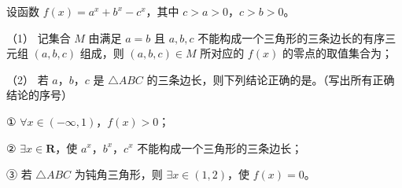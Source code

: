 \begin{question}
设函数 $f(x)=a^x+b^x-c^x$，其中 $c>a>0$，$c>b>0$。

（1） 记集合 $M$ 由满足 $a=b$ 且 $a,b,c$ 不能构成一个三角形的三条边长的有序三元组 $(a,b,c)$ 组成，则 $(a,b,c)\in M$ 所对应的 $f(x)$ 的零点的取值集合为\gkblank{}；

（2） 若 $a$，$b$，$c$ 是 $\triangle ABC$ 的三条边长，则下列结论正确的是\gkblank{}。（写出所有正确结论的序号）

① $\forall x\in(-\infty,1)$，$f(x)>0$；

② $\exists x\in\mathbf R$，使 $a^x$，$b^x$，$c^x$ 不能构成一个三角形的三条边长；

③ 若 $\triangle ABC$ 为钝角三角形，则 $\exists x\in(1,2)$，使 $f(x)=0$。

\end{question}

